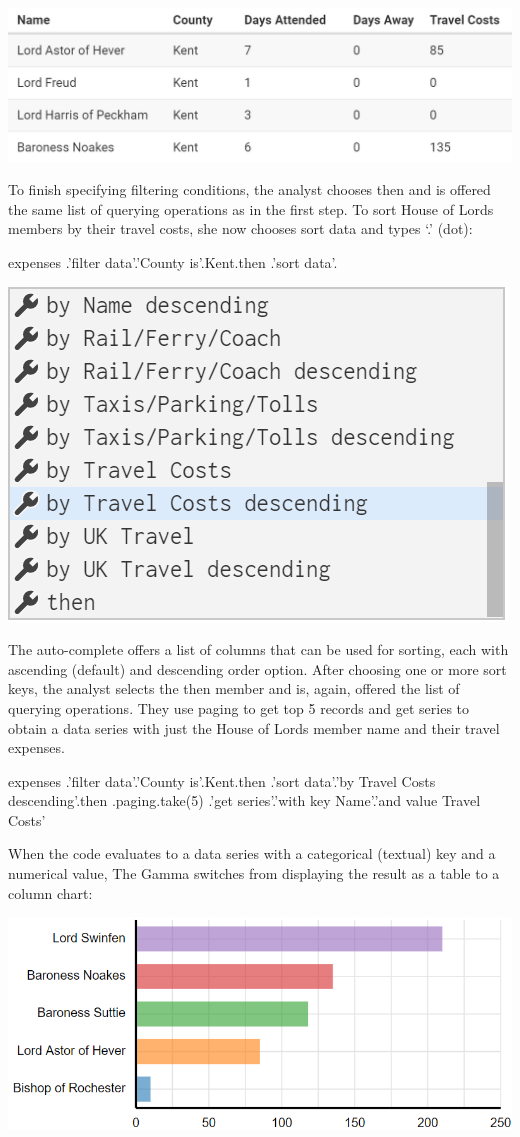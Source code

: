 \documentclass{sigchi}
\newcommand{\ikvd}[1]{{\fontfamily{zi4}\selectfont\small #1}}
\newcommand{\tg}{The Gamma\xspace}
\begin{document}
\includegraphics[width=1\columnwidth]{figures/lords3}

To finish specifying filtering conditions, the analyst chooses \ikvd{then} and is offered the
same list of querying operations as in the first step. To sort House of Lords members by their
travel costs, she now chooses \ikvd{sort data} and types `.' (dot):

\begin{thegamma}
expenses
  .'filter data'.'County is'.Kent.then
  .'sort data'.
\end{thegamma}
\qquad\includegraphics[width=0.5\columnwidth]{figures/lords4}

The auto-complete offers a list of columns that can be used for sorting, each with ascending
(default) and descending order option. After choosing one or more sort keys, the analyst selects
the \ikvd{then} member and is, again, offered the list of querying operations. They use
\ikvd{paging} to get top 5 records and \ikvd{get series} to obtain a data series with just
the House of Lords member name and their travel expenses.

\begin{thegamma}
expenses
  .'filter data'.'County is'.Kent.then
  .'sort data'.'by Travel Costs descending'.then
  .paging.take(5)
  .'get series'.'with key Name'.'and value Travel Costs'
\end{thegamma}

When the code evaluates to a data series with a categorical (textual) key and a numerical value,
\tg switches from displaying the result as a table to a column chart:

\includegraphics[width=1\columnwidth]{figures/lords5}
\vspace{-1.5em}
\end{document}
